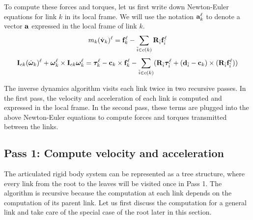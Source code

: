 To compute these forces and torques, let us first write down
Newton-Euler equations for link $k$ in its local frame. We will use
the notation $\mathbf{a}_k^\ell$ to denote a vector $\mathbf{a}$ expressed in
the local frame of link $k$. 
\begin{equation}
\label{eqn:local_newton}
m_k (\dot{\mathbf{v}}_k)^\ell  =  \mathbf{f}_k^\ell - \sum_{\tilde{i} \in
  c(k)} \mathbf{R}_{\tilde{i}}\mathbf{f}_{\tilde{i}}^\ell 
\end{equation}
\begin{equation}
\label{eqn:local_euler}
\mathbf{I}_{ck} (\dot{\bm{\omega}}_k)^\ell + \bm{\omega}_k^\ell \times
\mathbf{I}_{ck} \bm{\omega}_k^\ell =  \bm{\tau}_k^\ell - \mathbf{c}_k \times
\mathbf{f}_k^\ell - \sum_{\tilde{i} \in c(k)} (\mathbf{R}_{\tilde{i}}\bm{\tau}_{\tilde{i}}^\ell +
(\mathbf{d}_{\tilde{i}} - \mathbf{c}_k) \times (\mathbf{R}_{\tilde{i}} \mathbf{f}_{\tilde{i}}^\ell))
\end{equation}

The inverse dynamics algorithm visits each link twice in two recursive
passes. In the first pass, the velocity and acceleration of each link
is computed and expressed in the local frame. In the second pass,
these terms are plugged into the above Newton-Euler equations to compute
forces and torques transmitted between the links.

\subsection{Pass 1: Compute velocity and acceleration}
The articulated rigid body system can be represented as a tree
structure, where every link from the root to the leaves will be
visited once in Pass 1. The algorithm is recursive because the
computation at each link depends on the computation of its parent
link. Let us first discuss the computation for a general link and take
care of the special case of the root later in this section.

